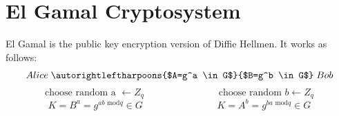 \documentclass{scribe}
\begin{document}
\vspace{10mm}


\section{El Gamal Cryptosystem}
El Gamal is the public key encryption version of Diffie Hellmen. It works as follows:
$$ Alice \;\autorightleftharpoons{$A=g^a \in G$}{$B=g^b \in G$}\; Bob $$
$$ \text{choose random a }\leftarrow Z_q \;\hspace{3cm}\; \text{choose random }b \leftarrow Z_q $$
$$ K = B^a = g^{ab\text{ mod}q} \in G \;\hspace{3cm}\; K = A^b = g^{ba\text{ mod}q} \in G $$
\end{document}
